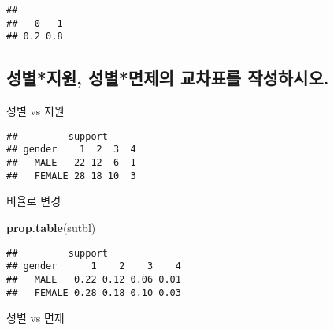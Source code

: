 \documentclass[
]{article}
\newenvironment{Shaded}{\begin{snugshade}}{\end{snugshade}}
\newcommand{\DataTypeTok}[1]{\textcolor[rgb]{0.13,0.29,0.53}{#1}}
\newcommand{\KeywordTok}[1]{\textcolor[rgb]{0.13,0.29,0.53}{\textbf{#1}}}
\newcommand{\NormalTok}[1]{#1}
\newcommand{\OperatorTok}[1]{\textcolor[rgb]{0.81,0.36,0.00}{\textbf{#1}}}
\newcommand{\StringTok}[1]{\textcolor[rgb]{0.31,0.60,0.02}{#1}}
\begin{document}
\begin{verbatim}
## 
##   0   1 
## 0.2 0.8
\end{verbatim}

\hypertarget{uxc131uxbcc4uxc9c0uxc6d0-uxc131uxbcc4uxba74uxc81cuxc758-uxad50uxcc28uxd45cuxb97c-uxc791uxc131uxd558uxc2dcuxc624.}{%
\subsection{성별*지원, 성별*면제의 교차표를
작성하시오.}\label{uxc131uxbcc4uxc9c0uxc6d0-uxc131uxbcc4uxba74uxc81cuxc758-uxad50uxcc28uxd45cuxb97c-uxc791uxc131uxd558uxc2dcuxc624.}}

성별 vs 지원

\begin{Shaded}
\end{Shaded}

\begin{verbatim}
##         support
## gender    1  2  3  4
##   MALE   22 12  6  1
##   FEMALE 28 18 10  3
\end{verbatim}

비율로 변경

\begin{Shaded}
\begin{Highlighting}[]
\KeywordTok{prop.table}\NormalTok{(sutbl)}
\end{Highlighting}
\end{Shaded}

\begin{verbatim}
##         support
## gender      1    2    3    4
##   MALE   0.22 0.12 0.06 0.01
##   FEMALE 0.28 0.18 0.10 0.03
\end{verbatim}

성별 vs 면제

\begin{Shaded}
\end{Shaded}
\end{document}
